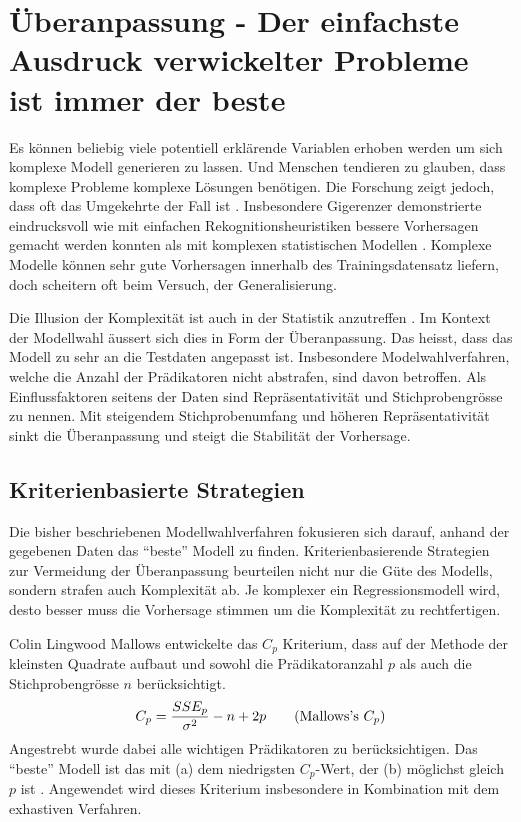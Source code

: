 \section{Überanpassung - Der einfachste Ausdruck verwickelter Probleme ist immer der beste}
Es können beliebig viele potentiell erklärende Variablen erhoben werden um sich komplexe Modell generieren zu lassen. 
Und Menschen tendieren zu glauben, dass komplexe Probleme komplexe Lösungen benötigen. 
Die Forschung zeigt jedoch, dass oft das Umgekehrte der Fall ist \cite[p.3]{armstrong2011illusions}. 
Insbesondere Gigerenzer demonstrierte eindrucksvoll wie mit einfachen Rekognitionsheuristiken bessere Vorhersagen gemacht werden konnten als mit komplexen statistischen Modellen \cite{borges1999can}.
Komplexe Modelle können sehr gute Vorhersagen innerhalb des Trainingsdatensatz liefern, doch  scheitern oft beim Versuch, der Generalisierung.  

Die Illusion der Komplexität ist auch in der Statistik anzutreffen \cite[p. 3]{armstrong2011illusions}. 
Im Kontext der Modellwahl äussert sich dies in Form der Überanpassung. Das heisst, dass das Modell zu sehr an die Testdaten angepasst ist.
Insbesondere Modelwahlverfahren, welche die Anzahl der Prädikatoren nicht abstrafen, sind davon betroffen.
Als Einflussfaktoren seitens der Daten sind Repräsentativität und Stichprobengrösse zu nennen. 
Mit steigendem Stichprobenumfang und höheren Repräsentativität sinkt die Überanpassung und steigt die Stabilität der Vorhersage.

\subsection{Kriterienbasierte Strategien}
Die bisher beschriebenen Modellwahlverfahren fokusieren sich darauf, anhand der gegebenen Daten das ``beste'' Modell zu finden.
Kriterienbasierende Strategien zur Vermeidung der Überanpassung beurteilen nicht nur die Güte des Modells, sondern strafen auch Komplexität ab.
Je komplexer ein Regressionsmodell wird, desto besser muss die Vorhersage stimmen um die Komplexität zu rechtfertigen.

Colin Lingwood Mallows entwickelte das $C_p$ Kriterium, dass auf der Methode der kleinsten Quadrate  aufbaut und sowohl die Prädikatoranzahl $p$ als auch die Stichprobengrösse $n$ berücksichtigt. 
\begin{equation}
C_p={SSE_p \over \sigma^2} - n + 2p
\tag{Mallows's $C_p$}
\end{equation}
Angestrebt wurde dabei alle wichtigen Prädikatoren zu berücksichtigen. 
Das ``beste'' Modell ist das mit (a) dem niedrigsten $C_p$-Wert, der (b) möglichst gleich $p$ ist \cite{gilmour1996interpretation}. Angewendet wird dieses Kriterium insbesondere in Kombination mit dem exhastiven Verfahren.


